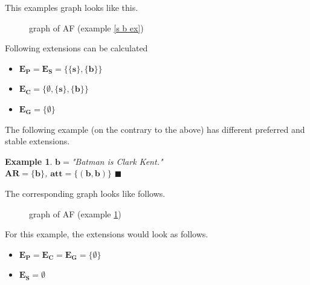 \documentclass[12pt]{report}
\numberwithin{figure}{chapter}
\theoremstyle{break}
\newtheorem{exmpl}{Example}[chapter]
\newenvironment{myexmpl}{\begin{exmpl}}{$\blacksquare$ \end{exmpl}}
\begin{document}
This examples graph looks like this.
\begin{figure}[h!]
\begin{center}\end{center}
\caption{graph of AF (example \ref{s b ex})}
\end{figure}

Following extensions can be calculated
\begin{itemize}
	\item{$\bm{E_{P}=E_{S}=\{\{s\},\{b\}\}}$}
	\item{$\bm{E_{C}=\{\emptyset,\{s\},\{b\}\}}$}
	\item{$\bm{E_{G}=\{\emptyset\}}$}
\end{itemize}

The following example (on the contrary to the above) has different preferred and stable extensions.

\begin{myexmpl}
$\bm{b=}$"Batman is Clark Kent."\\
$\bm{AR=\{b\}}$, $\bm{att=\{(b,b)\}}$
\label{b loop ex}
\end{myexmpl}

The corresponding graph looks like follows.
\begin{figure}[h!]
\begin{center}\end{center}
\caption{graph of AF (example \ref{b loop ex})}
\end{figure}

For this example, the extensions would look as follows.
\begin{itemize}
	\item{$\bm{E_{P}=E_{C}=E_{G}=\{\emptyset\}}$}
	\item{$\bm{E_{S} = \emptyset}$}
\end{itemize}

\newpage
\end{document}
